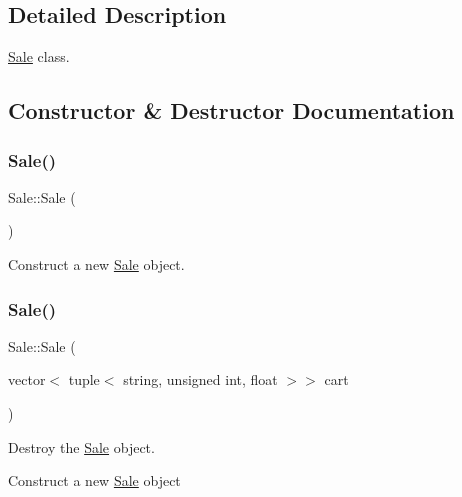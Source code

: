 \subsection{Detailed Description}
\hyperlink{classSale}{Sale} class. 

\subsection{Constructor \& Destructor Documentation}
\mbox{\label{classSale_a4b941c26295df31d639351b276a11956}} 
\subsubsection{\texorpdfstring{Sale()}{Sale()}\hspace{0.1cm}{\footnotesize\ttfamily [1/3]}}
{\footnotesize\ttfamily Sale\+::\+Sale (\begin{DoxyParamCaption}{ }\end{DoxyParamCaption})}



Construct a new \hyperlink{classSale}{Sale} object. 

\mbox{\label{classSale_a69f5e59b612e42837898b951ea08c3b7}} 
\subsubsection{\texorpdfstring{Sale()}{Sale()}\hspace{0.1cm}{\footnotesize\ttfamily [2/3]}}
{\footnotesize\ttfamily Sale\+::\+Sale (\begin{DoxyParamCaption}\item[{vector$<$ tuple$<$ string, unsigned int, float $>$$>$}]{cart }\end{DoxyParamCaption})}



Destroy the \hyperlink{classSale}{Sale} object. 

Construct a new \hyperlink{classSale}{Sale} object


